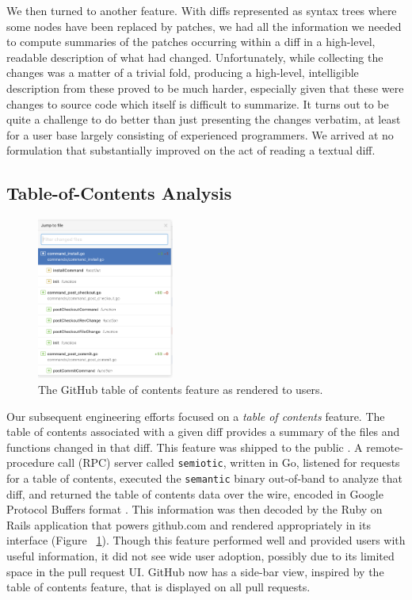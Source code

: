 \documentclass[acmsmall,fleqn]{acmart}
\begin{document}
We then turned to another feature. With diffs represented as syntax trees where
some nodes have been replaced by patches, we had all the information we needed
to compute summaries of the patches occurring within a diff in a high-level,
readable description of what had changed. Unfortunately, while collecting the
changes was a matter of a trivial fold, producing a high-level, intelligible
description from these proved to be much harder, especially given that these
were changes to source code which itself is difficult to summarize. It turns out
to be quite a challenge to do better than just presenting the changes verbatim,
at least for a user base largely consisting of experienced programmers. We arrived
at no formulation that substantially improved on the act of reading a textual diff.

\subsection{Table-of-Contents Analysis}

\begin{figure}
  \begin{center}
    \includegraphics[width=0.4\textwidth]{table-of-contents-screenshot.png}
  \end{center}
  \caption{The GitHub table of contents feature as rendered to users.}
  \label{fig:TOCScreenshot}
\end{figure}

Our subsequent engineering efforts focused on a \textit{table of contents}
feature. The table of contents associated with a given diff provides a summary
of the files and functions changed in that diff. This feature was shipped to the
public \cite{rix17changed}. A remote-procedure call (RPC) server called
\texttt{semiotic}, written in Go, listened for requests for a table of contents,
executed the \texttt{semantic} binary out-of-band to analyze that diff, and
returned the table of contents data over the wire, encoded in Google Protocol
Buffers format \cite{google08protocol}. This information was then decoded by the
Ruby on Rails application that powers \textsf{github.com} and rendered
appropriately in its interface (Figure ~\ref{fig:TOCScreenshot}).
Though this feature performed well and provided users with useful information,
it did not see wide user adoption, possibly due to its limited space in the pull
request UI. GitHub now has a side-bar view, inspired by the table of contents
feature, that is displayed on all pull requests.
\end{document}

